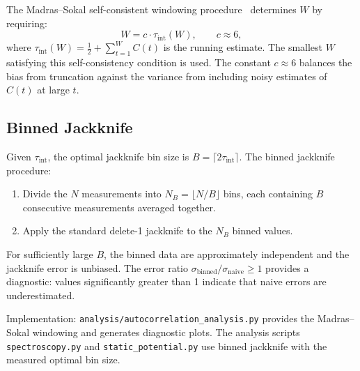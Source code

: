\documentclass[12pt]{article}
\newcommand{\code}[1]{\texttt{#1}}
\begin{document}
The Madras--Sokal self-consistent windowing procedure~\cite{MadrasSokal1988} determines $W$ by requiring:
\begin{equation}
\label{eq:ms_window}
W = c \cdot \tau_{\mathrm{int}}(W), \qquad c \approx 6,
\end{equation}
where $\tau_{\mathrm{int}}(W) = \frac{1}{2} + \sum_{t=1}^{W} C(t)$ is the running estimate. The smallest $W$ satisfying this self-consistency condition is used. The constant $c \approx 6$ balances the bias from truncation against the variance from including noisy estimates of $C(t)$ at large $t$.

\subsection{Binned Jackknife}

Given $\tau_{\mathrm{int}}$, the optimal jackknife bin size is $B = \lceil 2\tau_{\mathrm{int}} \rceil$. The binned jackknife procedure:
\begin{enumerate}
\item Divide the $N$ measurements into $N_B = \lfloor N/B \rfloor$ bins, each containing $B$ consecutive measurements averaged together.
\item Apply the standard delete-1 jackknife to the $N_B$ binned values.
\end{enumerate}
For sufficiently large $B$, the binned data are approximately independent and the jackknife error is unbiased. The error ratio $\sigma_{\mathrm{binned}}/\sigma_{\mathrm{naive}} \geq 1$ provides a diagnostic: values significantly greater than 1 indicate that naive errors are underestimated.

Implementation: \code{analysis/autocorrelation\_analysis.py} provides the Madras--Sokal windowing and generates diagnostic plots. The analysis scripts \code{spectroscopy.py} and \code{static\_potential.py} use binned jackknife with the measured optimal bin size.


\end{document}
